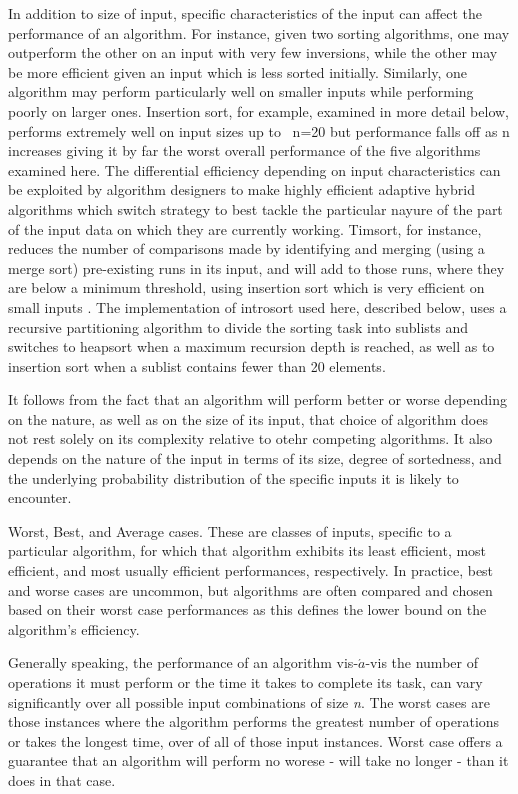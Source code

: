 \documentclass[12pt, a4paper]{article}
\begin{document}
In addition to size of input, specific characteristics of the input can affect the performance of an algorithm. For instance, given two sorting algorithms, one may outperform the other on an input with very few inversions, while the other may be more efficient given an input which is less sorted initially. Similarly, one algorithm may perform particularly well on smaller inputs while performing poorly on larger ones. Insertion sort, for example, examined in more detail below, performs extremely well on input sizes up to ~n=20 but performance falls off as n increases giving it by far the worst overall performance of the five algorithms examined here. The differential efficiency depending on input characteristics can be exploited by algorithm designers to make highly efficient adaptive hybrid algorithms which switch strategy to best tackle the particular nayure of the part of the input data on which they are currently working. Timsort, for instance, reduces the number of comparisons made by identifying and merging (using a merge sort) pre-existing runs in its input, and will add to those runs, where they are below a minimum threshold, using insertion sort which is very efficient on small inputs \autocite{enwiki:997404113}. The implementation of introsort used here, described below, uses a recursive partitioning algorithm to divide the sorting task into sublists and switches to heapsort when a maximum recursion depth is reached, as well as to insertion sort when a sublist contains fewer than 20 elements.

It follows from the fact that an algorithm will perform better or worse depending on the nature, as well as on the size of its input, that choice of algorithm does not rest solely on its complexity relative to otehr competing algorithms. It also depends on the nature of the input in terms of its size, degree of sortedness, and the underlying probability distribution of the specific inputs it is likely to encounter.

Worst, Best, and Average cases.
These are classes of inputs, specific to a particular algorithm, for which that algorithm exhibits its least efficient, most efficient, and most usually efficient performances, respectively. In practice, best and worse cases are uncommon, but algorithms are often compared and chosen based on their worst case performances as this defines the lower bound on the algorithm's efficiency.

Generally speaking, the performance of an algorithm vis-$\acute{a}$-vis the number of operations it must perform or the time it takes to complete its task, can vary significantly over all possible input combinations of size \emph{n}. The worst cases are those instances where the algorithm performs the greatest number of operations or takes the longest time, over of all of those input instances. Worst case offers a guarantee that an algorithm will perform no worese - will take no longer - than it does in that case. 
\end{document}
